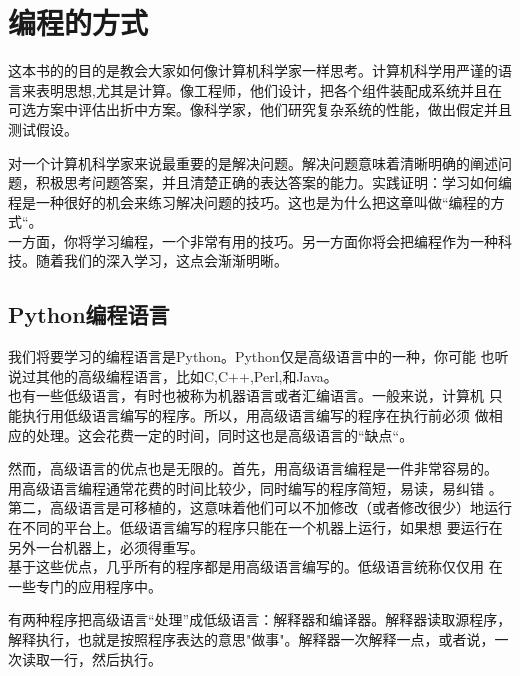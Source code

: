 \chapter{编程的方式}

这本书的的目的是教会大家如何像计算机科学家一样思考。计算机科学用严谨的语言来表明思想,尤其是计算。像工程师，他们设计，把各个组件装配成系统并且在可选方案中评估出折中方案。像科学家，他们研究复杂系统的性能，做出假定并且测试假设。



对一个计算机科学家来说最重要的是解决问题。解决问题意味着清晰明确的阐述问题，积极思考问题答案，并且清楚正确的表达答案的能力。实践证明：学习如何编程是一种很好的机会来练习解决问题的技巧。这也是为什么把这章叫做“编程的方式“。\\

一方面，你将学习编程，一个非常有用的技巧。另一方面你将会把编程作为一种科技。随着我们的深入学习，这点会渐渐明晰。

\section{Python编程语言}

我们将要学习的编程语言是Python。Python仅是高级语言中的一种，你可能
也听说过其他的高级编程语言，比如C,C++,Perl,和Java。\\

也有一些低级语言，有时也被称为机器语言或者汇编语言。一般来说，计算机
只能执行用低级语言编写的程序。所以，用高级语言编写的程序在执行前必须
做相应的处理。这会花费一定的时间，同时这也是高级语言的“缺点“。\\


然而，高级语言的优点也是无限的。首先，用高级语言编程是一件非常容易的。
用高级语言编程通常花费的时间比较少，同时编写的程序简短，易读，易纠错
。第二，高级语言是可移植的，这意味着他们可以不加修改（或者修改很少）地运行在不同的平台上。低级语言编写的程序只能在一个机器上运行，如果想
要运行在另外一台机器上，必须得重写。\\

基于这些优点，几乎所有的程序都是用高级语言编写的。低级语言统称仅仅用
在一些专门的应用程序中。


有两种程序把高级语言“处理”成低级语言：解释器和编译器。解释器读取源程序，解释执行，也就是按照程序表达的意思"做事"。解释器一次解释一点，或者说，一次读取一行，然后执行。\\

